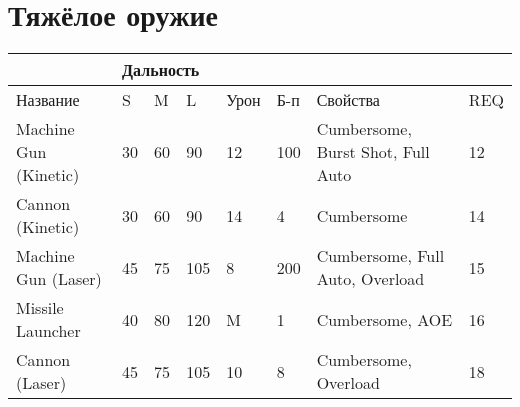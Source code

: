     \section*{Тяжёлое оружие}
        \begin{table}[H]
            \centering
            \begin{tabular}{|l|lll|l|l|l|l|}
                \hline
                                    & \multicolumn{3}{l|}{Дальность}                          &      &     &                                   &     \\ \hline
                Название              & \multicolumn{1}{l|}{S}  & \multicolumn{1}{l|}{M}  & L   & Урон & Б-п & Свойства                          & REQ \\ \hline
                Machine Gun (Kinetic) & \multicolumn{1}{l|}{30} & \multicolumn{1}{l|}{60} & 90  & 12   & 100 & Cumbersome, Burst Shot, Full Auto & 12  \\ \hline
                Cannon (Kinetic)      & \multicolumn{1}{l|}{30} & \multicolumn{1}{l|}{60} & 90  & 14   & 4   & Cumbersome                        & 14  \\ \hline
                Machine Gun (Laser)   & \multicolumn{1}{l|}{45} & \multicolumn{1}{l|}{75} & 105 & 8    & 200 & Cumbersome, Full Auto, Overload   & 15  \\ \hline
                Missile Launcher       & \multicolumn{1}{l|}{40} & \multicolumn{1}{l|}{80} & 120 & M    & 1   & Cumbersome, AOE                   & 16  \\ \hline
                Cannon (Laser)        & \multicolumn{1}{l|}{45} & \multicolumn{1}{l|}{75} & 105 & 10   & 8   & Cumbersome, Overload              & 18  \\ \hline
            \end{tabular}
        \end{table}